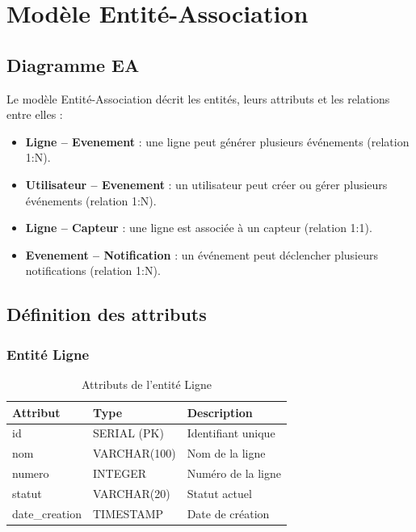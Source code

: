 \section{Mod\`ele Entit\'e-Association}

\subsection{Diagramme EA}

Le mod\`ele Entit\'e-Association d\'ecrit les entit\'es, leurs attributs et les relations entre elles :

\begin{itemize}
    \item \textbf{Ligne -- Evenement} : une ligne peut g\'en\'erer plusieurs \'ev\'enements (relation 1:N).
    \item \textbf{Utilisateur -- Evenement} : un utilisateur peut cr\'eer ou g\'erer plusieurs \'ev\'enements (relation 1:N).
    \item \textbf{Ligne -- Capteur} : une ligne est associ\'ee \`a un capteur (relation 1:1).
    \item \textbf{Evenement -- Notification} : un \'ev\'enement peut d\'eclencher plusieurs notifications (relation 1:N).
\end{itemize}


\subsection{D\'efinition des attributs}

\subsubsection{Entit\'e Ligne}

\begin{table}[htbp]
\centering
\renewcommand{\arraystretch}{1.3}
\begin{tabular}{l l l}
\toprule
\textbf{Attribut} & \textbf{Type} & \textbf{Description} \\
\midrule
id & SERIAL (PK) & Identifiant unique \\
nom & VARCHAR(100) & Nom de la ligne \\
numero & INTEGER & Num\'ero de la ligne \\
statut & VARCHAR(20) & Statut actuel \\
date\_creation & TIMESTAMP & Date de cr\'eation \\
\bottomrule
\end{tabular}
\caption{Attributs de l'entit\'e Ligne}
\label{tab:attributs_ligne}
\end{table}

